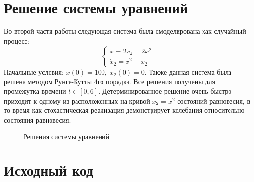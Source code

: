 \documentclass[a4paper]{article}
\begin{document}
\section{Решение системы уравнений}
Во второй части работы следующая система была смоделирована как случайный процесс:
\begin{displaymath}
  \left\{
  \begin{array}{lr}
    \dot x = 2 x_2 - 2x^2\\
    \dot x_2 = x^2 - x_2
  \end{array}
\right.
\end{displaymath}
Начальные условия: \(x(0)=100,\;x_2(0)=0\). Также данная система была решена методом Рунге-Кутты 4го порядка.
Все решения получены для промежутка времени \(t\in[0,6]\). Детерминированное решение очень быстро приходит к одному
из расположенных на кривой \(x_2=x^2\) состояний равновесия, в то время как стохастическая реализация демонстрирует
колебания относительно состояния равновесия.

\begin{figure}[H]
  \center
  \caption{Решения системы уравнений}
\end{figure}

\section{Исходный код}

\end{document}
